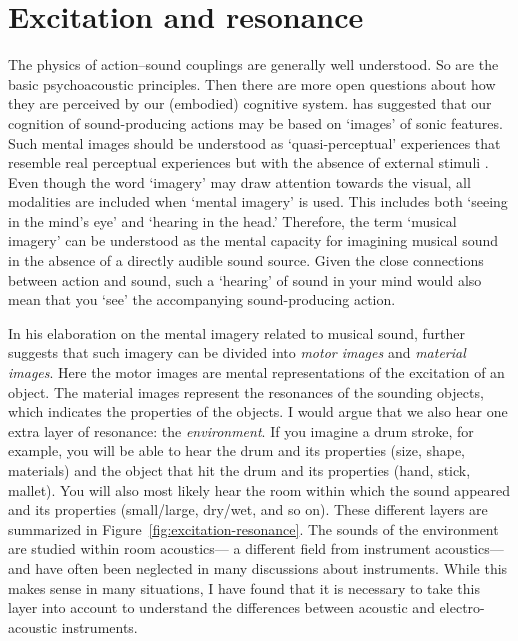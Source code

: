 \section{Excitation and resonance}

The physics of action--sound couplings are generally well understood. So are the basic psychoacoustic principles. Then there are more open questions about how they are perceived by our (embodied) cognitive system. \citet{godoy_imagined_2001} has suggested that our cognition of sound-producing actions may be based on `images' of sonic features. Such mental images should be understood as `quasi-perceptual' experiences that resemble real perceptual experiences but with the absence of external stimuli \citep{thomas_mental_2007}. Even though the word `imagery' may draw attention towards the visual, all modalities are included when `mental imagery' is used. This includes both `seeing in the mind's eye' and `hearing in the head.' Therefore, the term `musical imagery' can be understood as the mental capacity for imagining musical sound in the absence of a directly audible sound source. Given the close connections between action and sound, such a `hearing' of sound in your mind would also mean that you `see' the accompanying sound-producing action.

In his elaboration on the mental imagery related to musical sound, \citet{godoy_imagined_2001} further suggests that such imagery can be divided into \emph{motor images} and \emph{material images}. Here the motor images are mental representations of the excitation of an object. The material images represent the resonances of the sounding objects, which indicates the properties of the objects. I would argue that we also hear one extra layer of resonance: the \emph{environment}. If you imagine a drum stroke, for example, you will be able to hear the drum and its properties (size, shape, materials) and the object that hit the drum and its properties (hand, stick, mallet). You will also most likely hear the room within which the sound appeared and its properties (small/large, dry/wet, and so on). These different layers are summarized in Figure~\ref{fig:excitation-resonance}. The sounds of the environment are studied within room acoustics--- a different field from instrument acoustics---and have often been neglected in many discussions about instruments. While this makes sense in many situations, I have found that it is necessary to take this layer into account to understand the differences between acoustic and electro-acoustic instruments.

